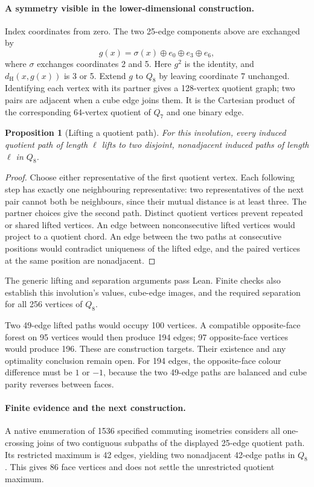 \documentclass[11pt,a4paper]{article}
\newtheorem{proposition}[theorem]{Proposition}
\theoremstyle{definition}
\theoremstyle{remark}
\newcommand{\Ham}{d_{\mathrm H}}
\begin{document}
\paragraph{A symmetry visible in the lower-dimensional construction.}
Index coordinates from zero. The two 25-edge components above are
exchanged by
\[
g(x)=\sigma(x)\oplus e_0\oplus e_3\oplus e_6,
\]
where $\sigma$ exchanges coordinates 2 and 5. Here $g^2$ is the identity,
and $\Ham(x,g(x))$ is 3 or 5. Extend $g$ to $Q_8$ by leaving coordinate 7
unchanged. Identifying each vertex with its partner gives a 128-vertex
quotient graph; two pairs are adjacent when a cube edge joins them.
It is the Cartesian product of the corresponding 64-vertex quotient
of $Q_7$ and one binary edge.

\begin{proposition}[Lifting a quotient path]
For this involution, every induced quotient path of length $\ell$
lifts to two disjoint, nonadjacent induced paths of length $\ell$
in $Q_8$.
\end{proposition}
\begin{proof}
Choose either representative of the first quotient vertex.
Each following step has exactly one neighbouring representative:
two representatives of the next pair cannot both be neighbours,
since their mutual distance is at least three. The partner choices
give the second path. Distinct quotient vertices prevent repeated
or shared lifted vertices. An edge between nonconsecutive lifted
vertices would project to a quotient chord. An edge between the
two paths at consecutive positions would contradict uniqueness of
the lifted edge, and the paired vertices at the same position are
nonadjacent.
\end{proof}
The generic lifting and separation arguments pass Lean. Finite
checks also establish this involution's values, cube-edge images,
and the required separation for all 256 vertices of $Q_8$.

Two 49-edge lifted paths would occupy 100 vertices. A compatible
opposite-face forest on 95 vertices would then produce 194 edges;
97 opposite-face vertices would produce 196. These are construction
targets. Their existence and any optimality conclusion remain open.
For 194 edges, the opposite-face colour difference must be $1$ or $-1$,
because the two 49-edge paths are balanced and cube parity reverses
between faces.

\paragraph{Finite evidence and the next construction.}
A native enumeration of 1536 specified commuting isometries considers
all one-crossing joins of two contiguous subpaths of the displayed
25-edge quotient path. Its restricted maximum is 42 edges, yielding
two nonadjacent 42-edge paths in $Q_8$. This gives 86 face vertices
and does not settle the unrestricted quotient maximum.
\end{document}

